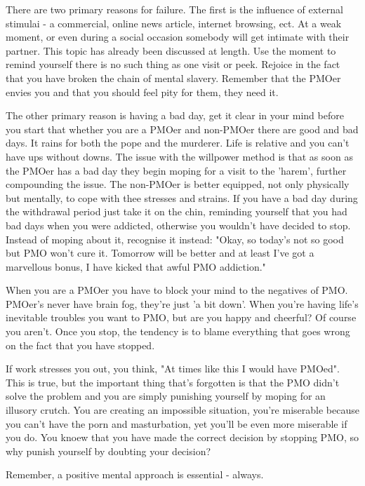 \documentclass[easypeasy.tex]{subfiles}
\begin{document}
There are two primary reasons for failure. The first is the influence of external stimulai - a commercial, online news article, internet browsing, ect. At a weak moment, or even during a social occasion somebody will get intimate with their partner. This topic has already been discussed at length. Use the moment to remind yourself there is no such thing as one visit or peek. Rejoice in the fact that you have broken the chain of mental slavery. Remember that the PMOer envies you and that you should feel pity for them, they need it.

The other primary reason is having a bad day, get it clear in your mind before you start that whether you are a PMOer and non-PMOer there are good and bad days. It rains for both the pope and the murderer. Life is relative and you can't have ups without downs. The issue with the willpower method is that as soon as the PMOer has a bad day they begin moping for a visit to the 'harem', further compounding the issue. The non-PMOer is better equipped, not only physically but mentally, to cope with thee stresses and strains. If you have a bad day during the withdrawal period just take it on the chin, reminding yourself that you had bad days when you were addicted, otherwise you wouldn't have decided to stop. Instead of moping about it, recognise it instead: "Okay, so today's not so good but PMO won't cure it. Tomorrow will be better and at least I've got a marvellous bonus, I have kicked that awful PMO addiction."

When you are a PMOer you have to block your mind to the negatives of PMO. PMOer's never have brain fog, they're just 'a bit down'. When you're having life's inevitable troubles you want to PMO, but are you happy and cheerful? Of course you aren't. Once you stop, the tendency is to blame everything that goes wrong on the fact that you have stopped.

If work stresses you out, you think, "At times like this I would have PMOed". This is true, but the important thing that's forgotten is that the PMO didn't solve the problem and you are simply punishing yourself by moping for an illusory crutch. You are creating an impossible situation, you're miserable because you can't have the porn and masturbation, yet you'll be even more miserable if you do. You knoew that you have made the correct decision by stopping PMO, so why punish yourself by doubting your decision?

{\huge Remember, a positive mental approach is essential - always.}
\end{document}
